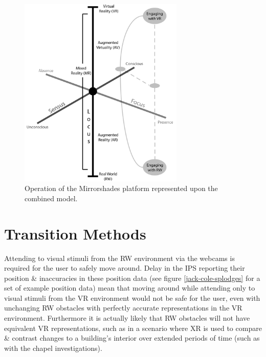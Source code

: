 \documentclass[oneside]{book}
\begin{document}
\begin{figure}[h]
	\begin{center}
		\includegraphics[width=0.7\textwidth]{images/focus-locus-sensus-with-virtuality-continuum-with-transition-updated.png}
		\caption{Operation of the Mirrorshades platform represented upon the combined model.}
		\label{focus-locus-sensus-with-virtuality-continuum-with-transition}
	\end{center}	
\end{figure}

\section{Transition Methods}
Attending to visual stimuli from the RW environment via the webcams is required for the user to safely move around. Delay in the IPS reporting their position \& inaccuracies in these position data (see figure \ref{jack-cole-splodges} for a set of example position data) mean that moving around while attending only to visual stimuli from the VR environment would not be safe for the user, even with unchanging RW obstacles with perfectly accurate representations in the VR environment. Furthermore it is actually likely that RW obstacles will not have equivalent VR representations, such as in a scenario where XR is used to compare \& contrast changes to a building's interior over extended periods of time (such as with the chapel investigations).
\end{document}
